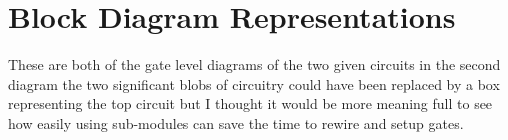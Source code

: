 \documentclass{article}
\begin{document}
\section{Block Diagram Representations}
\begin{center}
\end{center}
\begin{center}
\end{center}
These are both of the gate level diagrams of the two given circuits in the second diagram the two significant blobs of circuitry could have been replaced by a box representing the top circuit but I thought it would be more meaning full to see how easily using sub-modules can save the time to rewire and setup gates.
\end{document}
